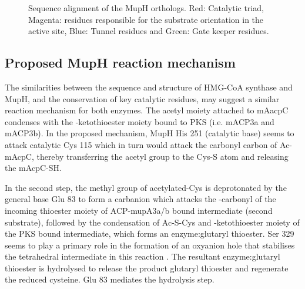 			\setlength\fboxsep{5pt}
			\setlength\fboxrule{1.5pt}
			\begin{figure} []
			\centering
			\caption[Sequence alignment of the MupH orthologs.]{Sequence alignment of the MupH orthologs. Red: Catalytic triad, Magenta: residues responsible for the substrate orientation in the active site, Blue: Tunnel residues and Green: Gate keeper residues. }
			\label{fig:MuphOrthoAli}
			\end{figure}				
\newpage

	\subsection{Proposed MupH reaction mechanism}
	\label{sec:muphreact}
	The similarities between the sequence and structure of HMG-CoA synthase and MupH, and the conservation of key catalytic residues, may suggest a similar reaction mechanism for both enzymes. The acetyl moiety attached to mAacpC condenses with the \bet-ketothioester moiety bound to PKS (i.e. mACP3a and mACP3b). In the proposed mechanism, MupH His 251 (catalytic base) seems to attack catalytic Cys 115 which in turn would attack the carbonyl carbon of Ac-mAcpC, thereby transferring the acetyl group to the Cys-S atom and releasing the mAcpC-SH.		
	
	In the second step, the methyl group of acetylated-Cys is deprotonated by the general base Glu 83 to form a carbanion which attacks the \bet-carbonyl of the incoming thioester moiety of ACP-mupA3a/b bound intermediate (second substrate), followed by the condensation of Ac-S-Cys and \bet-ketothioester moiety of the PKS bound intermediate, which forms an enzyme:glutaryl thioester. Ser 329 seems to play a primary role in the formation of an oxyanion hole that stabilises the tetrahedral intermediate in this reaction \parencite{Wu2007}. The resultant enzyme:glutaryl thioester is hydrolysed to release the product glutaryl thioester and regenerate the reduced cysteine. Glu 83 mediates the hydrolysis step.
	
